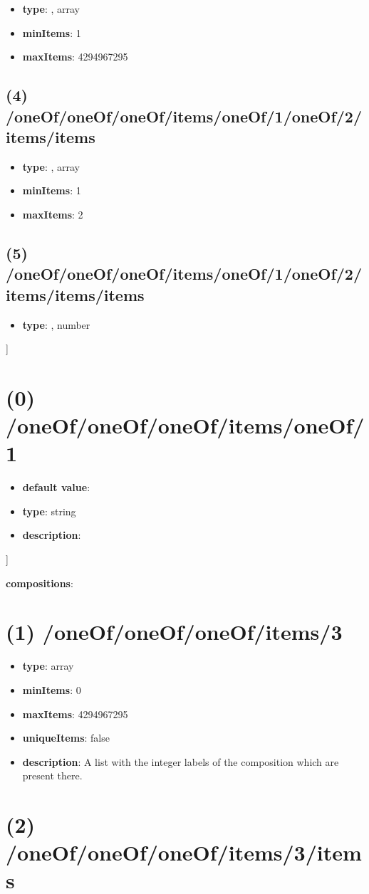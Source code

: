 \begin{itemize}[leftmargin=3em]\item {\bf type}: , array\item {\bf minItems}: 1
\item {\bf maxItems}: 4294967295
\end{itemize}\subsection{(4) /oneOf/oneOf/oneOf/items/oneOf/1/oneOf/2/items/items}
\begin{itemize}[leftmargin=4em]\item {\bf type}: , array\item {\bf minItems}: 1
\item {\bf maxItems}: 2
\end{itemize}\subsection{(5) /oneOf/oneOf/oneOf/items/oneOf/1/oneOf/2/items/items/items}
\begin{itemize}[leftmargin=5em]\item {\bf type}: , number\end{itemize}]\section{(0) /oneOf/oneOf/oneOf/items/oneOf/1}
\begin{itemize}[leftmargin=0em]\item {\bf default value}: 
\item {\bf type}: string
\item {\bf description}: 
\end{itemize}]\item {\bf compositions}: \section{(1) /oneOf/oneOf/oneOf/items/3}
\begin{itemize}[leftmargin=1em]\item {\bf type}: array
\item {\bf minItems}: 0
\item {\bf maxItems}: 4294967295
\item {\bf uniqueItems}: false
\item {\bf description}: A list with the integer labels of the composition which are present there.
\end{itemize}\section{(2) /oneOf/oneOf/oneOf/items/3/items}
